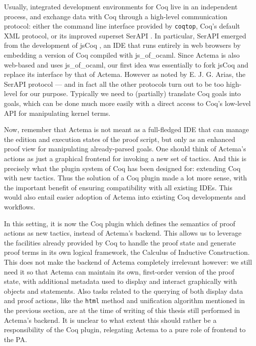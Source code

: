 Usually, integrated development environments for Coq live in an independent
process, and exchange data with Coq through a high-level communication protocol:
either the command line interface provided by \texttt{coqtop}, Coq's default XML
protocol, or its improved superset SerAPI .
In particular, SerAPI emerged from the development of jsCoq
, an IDE that runs entirely in web browsers by
embedding a version of Coq compiled with js\_of\_ocaml. Since Actema is also
web-based and uses js\_of\_ocaml, our first idea was essentially to fork jsCoq
and replace its interface by that of Actema. However as noted by E. J. G. Arias,
the SerAPI protocol --- and in fact all the other protocols turn out to be too
high-level for our purpose. Typically we need to (partially) translate Coq goals
into  goals, which can be done much more easily with a direct access to
Coq's low-level API for manipulating kernel terms.

Now, remember that Actema is not meant as a full-fledged IDE that can manage the
edition and execution states of the proof script, but only as an enhanced proof
view for manipulating already-parsed goals. One should think of Actema's actions
as just a graphical frontend for invoking a new set of tactics. And this is
precisely what the plugin system of Coq has been designed for: extending Coq
with new tactics. Thus the solution of a Coq plugin made a lot more sense, with
the important benefit of ensuring compatibility with all existing IDEs. This
would also entail easier adoption of Actema into existing Coq developments and
workflows.

In this setting, it is now the Coq plugin which defines the semantics of proof
actions as new tactics, instead of Actema's backend. This allows us to leverage
the facilities already provided by Coq to handle the proof state and generate
proof terms in its own logical framework, the Calculus of Inductive
Construction. This does not make the backend of Actema completely irrelevant
however: we still need it so that Actema can maintain its own, first-order
version of the proof state, with additional metadata used to display and
interact graphically with objects and statements. Also tasks related to the
querying of both display data and proof actions, like the \texttt{html} method
and unification algorithm mentioned in the previous section, are at the time of
writing of this thesis still performed in Actema's backend. It is unclear to
what extent this should rather be a responsibility of the Coq plugin, relegating
Actema to a pure role of frontend to the PA.

